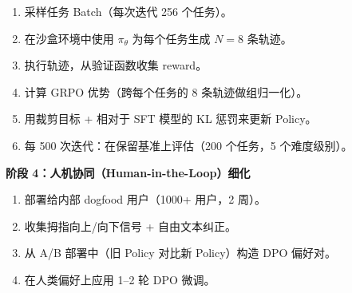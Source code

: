 \begin{keybox}
\begin{enumerate}
  \item 采样任务 Batch（每次迭代 256 个任务）。
  \item 在沙盒环境中使用 $\pi_\theta$ 为每个任务生成 $N=8$ 条轨迹。
  \item 执行轨迹，从验证函数收集 reward。
  \item 计算 GRPO 优势（跨每个任务的 8 条轨迹做组归一化）。
  \item 用裁剪目标 + 相对于 SFT 模型的 KL 惩罚来更新 Policy。
  \item 每 500 次迭代：在保留基准上评估（200 个任务，5 个难度级别）。
\end{enumerate}

\textbf{阶段 4：人机协同（Human-in-the-Loop）细化}

\begin{enumerate}
  \item 部署给内部 dogfood 用户（1000+ 用户，2 周）。
  \item 收集拇指向上/向下信号 + 自由文本纠正。
  \item 从 A/B 部署中（旧 Policy 对比新 Policy）构造 DPO 偏好对。
  \item 在人类偏好上应用 1--2 轮 DPO 微调。
\end{enumerate}
\end{keybox}

